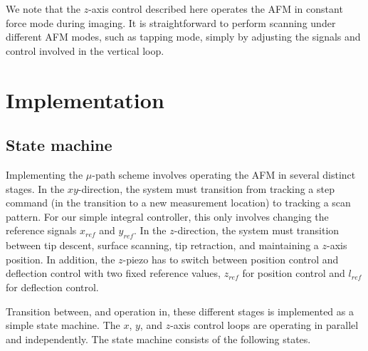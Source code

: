 \documentclass[twocolumn,twoside]{IEEEtran/IEEEtran}
\begin{document}
We note that the $z$-axis control described here operates the AFM in constant
force mode during imaging. It is straightforward to perform scanning under
different AFM modes, such as tapping mode, simply by adjusting the signals and
control involved in the vertical loop.

\section{Implementation}\label{sec:implementation}
	
\subsection{State machine}
Implementing the $\mu$-path scheme involves operating the AFM in several
distinct stages. In the $xy$-direction, the system must transition from tracking
a step command (in the transition to a new measurement location) to tracking a
scan pattern. For our simple integral controller, this only involves changing
the reference signals $x_{ref}$ and $y_{ref}$. In the $z$-direction, the system
must transition between tip descent, surface scanning, tip retraction, and
maintaining a $z$-axis position. In addition, the $z$-piezo has to switch
between position control and deflection control with two fixed reference values,
$z_{ref}$ for position control and $l_{ref}$ for deflection control.
	
Transition between, and operation in, these different stages is implemented as a
simple state machine. The $x$, $y$, and $z$-axis control loops are operating in
parallel and independently. The state machine consists of the following states.
\end{document}
